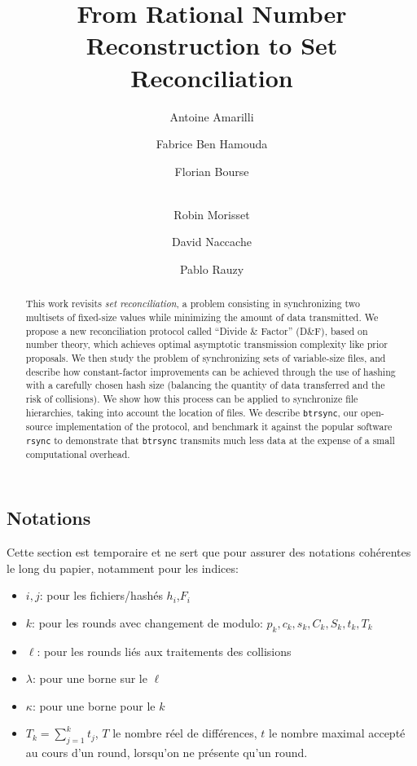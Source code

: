 \documentclass[11pt]{llncs}
\newcommand{\df}{D\&F\xspace}
\newcommand{\btrsync}{\texttt{btrsync}\xspace}
\newcommand{\rsync}{\texttt{rsync}\xspace}
\newcommand{\comm}[1]{\marginpar{%
\vskip-\baselineskip %
\raggedright\footnotesize
\itshape\hrule\smallskip#1\par\smallskip\hrule}}
\begin{document}
\title{From Rational Number Reconstruction to Set Reconciliation}

\author{Antoine Amarilli \and Fabrice Ben Hamouda \and Florian Bourse \and\\
Robin Morisset \and David Naccache \and Pablo Rauzy}


\maketitle
\comm{Penser à voir si on change le titre.}

\begin{abstract}
  This work revisits \textit{set reconciliation}, a problem consisting in synchronizing two multisets of fixed-size values while minimizing the amount of data transmitted. We propose a new reconciliation protocol called ``Divide \& Factor'' (\df), based on number theory, which achieves optimal asymptotic transmission complexity like prior proposals. We then study the problem of synchronizing sets of variable-size files, and describe how constant-factor improvements can be achieved through the use of hashing with a carefully chosen hash size (balancing the quantity of data transferred and the risk of collisions). We show how this process can be applied to synchronize file hierarchies, taking into account the location of files. We describe \btrsync, our open-source implementation of the protocol, and benchmark it against the popular software \rsync to demonstrate that \btrsync transmits much less data at the expense of a small computational overhead.
\end{abstract}

\subsection*{Notations}

Cette section est temporaire et ne sert que pour assurer des notations cohérentes le long du papier, notamment pour les indices:
\begin{itemize}
\item $i,j$: pour les fichiers/hashés $h_i$,$F_i$
\item $k$: pour les rounds avec changement de modulo: $p_k,c_k,s_k,C_k,S_k,t_k,T_k$
\item $\ell$: pour les rounds liés aux traitements des collisions
\item $\lambda$: pour une borne sur le $\ell$
\item $\kappa$: pour une borne pour le $k$
\item $T_k = \sum_{j=1}^k t_j$, $T$ le nombre réel de différences, $t$ le nombre
  maximal accepté au cours d'un round, lorsqu'on ne présente qu'un round.
\end{itemize}
\end{document}
